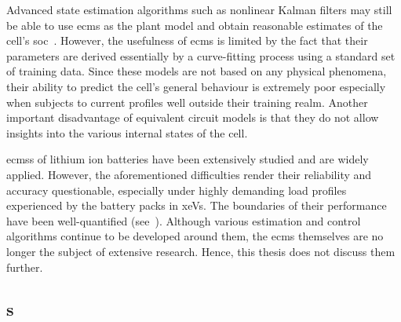 Advanced state estimation algorithms such  as nonlinear Kalman filters may still
be able to use \glspl{ecm} as the plant model and obtain reasonable estimates of
the  cell's  \gls{soc}~\cite{Plett2006,  Sun2011}. However,  the  usefulness  of
\glspl{ecm} is limited by the fact that their parameters are derived essentially
by a  curve-fitting process using a  standard set of training  data. Since these
models are  not based on  any physical phenomena,  their ability to  predict the
cell's general behaviour  is extremely poor especially when  subjects to current
profiles well  outside their training  realm. Another important  disadvantage of
equivalent circuit  models is that they  do not allow insights  into the various
internal states of the cell.

\glspl{ecm}s  of  lithium  ion  batteries  have  been  extensively  studied  and
are  widely  applied.  However,  the aforementioned  difficulties  render  their
reliability and  accuracy questionable,  especially under highly  demanding load
profiles  experienced by  the battery  packs in  \glspl{xeV}. The  boundaries of
their  performance have  been well-quantified  (see~\cite{Plett2015,Plett2016}).
Although  various estimation  and control  algorithms continue  to be  developed
around them, the  \glspl{ecm} themselves are no longer the  subject of extensive
research. Hence, this thesis does not discuss them further.

\subsection{s}

